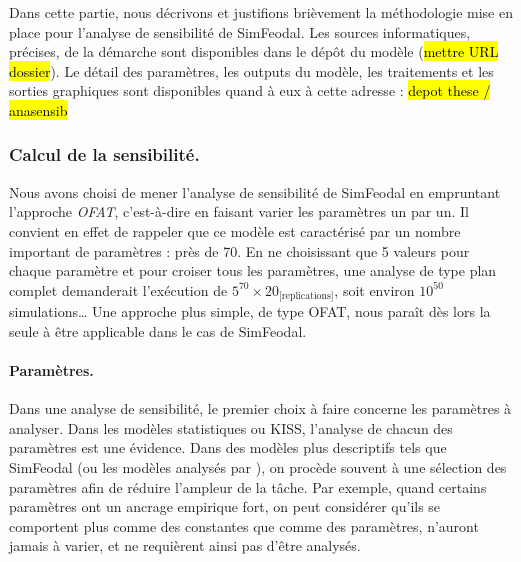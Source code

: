 Dans cette partie, nous décrivons et justifions brièvement la méthodologie mise en place pour l'analyse de sensibilité de SimFeodal.
Les sources informatiques, précises, de la démarche sont disponibles dans le dépôt du modèle (\hl{mettre URL dossier}).
Le détail des paramètres, les outputs du modèle, les traitements et les sorties graphiques sont disponibles quand à eux à cette adresse : \hl{depot these / anasensib}

\subsubsection{Calcul de la sensibilité.}

Nous avons choisi de mener l'analyse de sensibilité de SimFeodal en empruntant l'approche \textit{OFAT}, c'est-à-dire en faisant varier les paramètres un par un.
Il convient en effet de rappeler que ce modèle est caractérisé par un nombre important de paramètres : près de 70.
En ne choisissant que 5 valeurs pour chaque paramètre et pour croiser tous les paramètres, une analyse de type plan complet demanderait l'exécution de $5^{70} \times 20_{\text{[replications]}}$, soit environ $10^{50}$ simulations\ldots{}
Une approche plus simple, de type OFAT, nous paraît dès lors la seule  à être applicable dans le cas de SimFeodal.


\paragraph{Paramètres.}
Dans une analyse de sensibilité, le premier choix à faire concerne les paramètres à analyser.
Dans les modèles statistiques ou KISS, l'analyse de chacun des paramètres est une évidence.
Dans des modèles plus descriptifs tels que SimFeodal (ou les modèles analysés par \textcite{hirtzel2015exploration}), on procède souvent à une sélection des paramètres afin de réduire l'ampleur de la tâche.
Par exemple, quand certains paramètres ont un ancrage empirique fort, on peut considérer qu'ils se comportent plus comme des constantes que comme des paramètres, n'auront jamais à varier, et ne requièrent ainsi pas d'être analysés.


